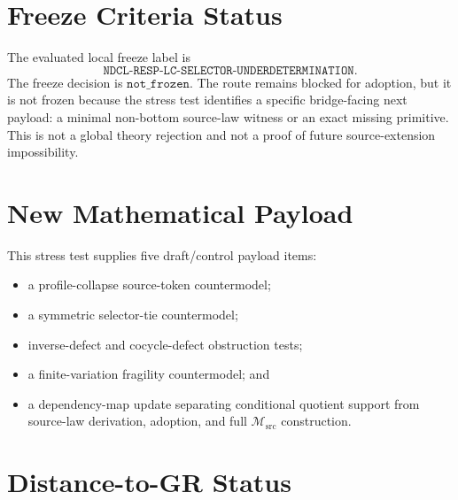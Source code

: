 \documentclass[11pt]{article}
\newcommand{\Msrc}{\mathcal{M}_{\mathrm{src}}}
\begin{document}
\section{Freeze Criteria Status}

The evaluated local freeze label is
\[
\texttt{NDCL-RESP-LC-SELECTOR-UNDERDETERMINATION}.
\]
The freeze decision is \(\texttt{not\_frozen}\). The route remains blocked
for adoption, but it is not frozen because the stress test identifies a
specific bridge-facing next payload: a minimal non-bottom source-law witness
or an exact missing primitive. This is not a global theory rejection and not a
proof of future source-extension impossibility.

\section{New Mathematical Payload}

This stress test supplies five draft/control payload items:
\begin{itemize}
  \item a profile-collapse source-token countermodel;
  \item a symmetric selector-tie countermodel;
  \item inverse-defect and cocycle-defect obstruction tests;
  \item a finite-variation fragility countermodel; and
  \item a dependency-map update separating conditional quotient support from
  source-law derivation, adoption, and full \(\Msrc\) construction.
\end{itemize}

\section{Distance-to-GR Status}
\end{document}
